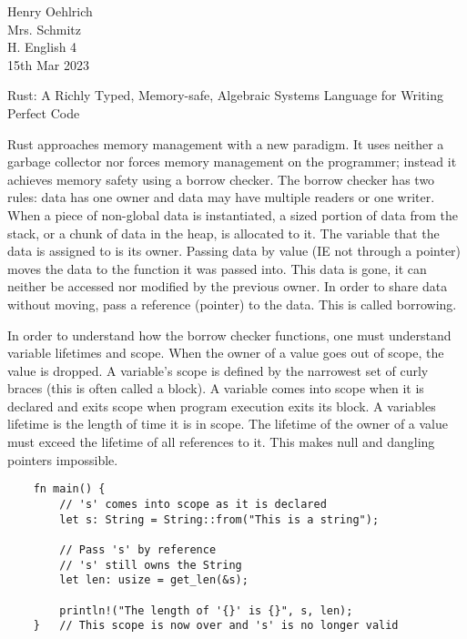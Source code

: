 \documentclass[12pt]{article}
\author{Henry Oehlrich}
\begin{document}
\begin{flushleft}
Henry Oehlrich \\
Mrs. Schmitz \\
H. English 4 \\
15th Mar 2023 \\
\begin{center}
Rust: A Richly Typed, Memory-safe, Algebraic Systems Language for Writing Perfect Code
\end{center}
\setlength{\parindent}{0.5in}


Rust approaches memory management with a new paradigm. It uses neither a
garbage collector nor forces memory management on the programmer; instead it
achieves memory safety using a borrow checker. The borrow checker has two
rules: data has one owner and data may have multiple readers or one writer.
When a piece of non-global data is instantiated, a sized portion of data from
the stack, or a chunk of data in the heap, is allocated to it. The variable
that the data is assigned to is its owner. Passing data by value (IE not
through a pointer) moves the data to the function it was passed into. This data
is gone, it can neither be accessed nor modified by the previous owner. In
order to share data without moving, pass a reference (pointer) to the data.
This is called borrowing. 

In order to understand how the borrow checker functions, one must understand
variable lifetimes and scope. When the owner of a value goes out of scope, the
value is dropped. A variable's scope is defined by the narrowest set of curly
braces (this is often called a block). A variable comes into scope when it is
declared and exits scope when program execution exits its block. A variables
lifetime is the length of time it is in scope. The lifetime of the owner of a
value must exceed the lifetime of all references to it. This makes null and
dangling pointers impossible.

\singlespacing{}
\begin{verbatim}
    fn main() {
        // 's' comes into scope as it is declared
        let s: String = String::from("This is a string");

        // Pass 's' by reference
        // 's' still owns the String
        let len: usize = get_len(&s);

        println!("The length of '{}' is {}", s, len);
    }   // This scope is now over and 's' is no longer valid


\end{verbatim}
\end{flushleft}
\end{document}
